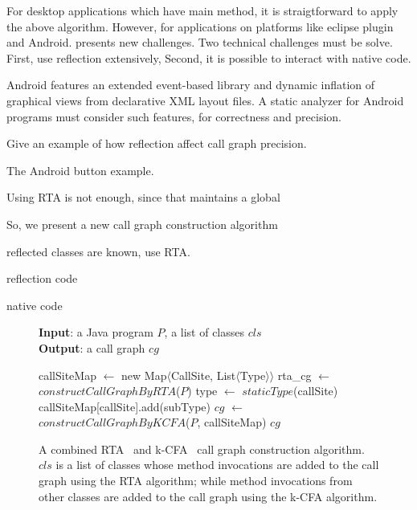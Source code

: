 For desktop applications which have main method, it is straigtforward to apply
the above algorithm. However, for applications on platforms like eclipse plugin
and Android. presents new challenges. Two technical challenges must be solve.
First, use reflection extensively, Second, it is possible to interact with
native code.

Android features an extended event-based library and dynamic inflation of
graphical views from declarative XML layout files.
A static analyzer for Android programs must consider such features, for
correctness and precision.

Give an example of how reflection affect call graph precision.

The Android button example.

Using RTA is not enough, since that maintains a global

So, we present a new call graph construction algorithm

reflected classes are known, use RTA.

reflection code

native code

\begin{figure}[t]
\textbf{Input}: a Java program $P$, a list of classes $cls$\\
\textbf{Output}: a call graph $cg$\\
\vspace{-5mm}
\begin{algorithmic}[1]
\STATE callSiteMap $\leftarrow$ new Map$\langle$CallSite, List$\langle$Type$\rangle$$\rangle$
\STATE rta\_cg $\leftarrow$ $constructCallGraphByRTA$($P$)
\STATE type $\leftarrow$ $staticType$(callSite)
\STATE callSiteMap[callSite].add(subType)
\ENDIF
\ENDFOR
\ENDIF
\ENDFOR
\ENDFOR
\STATE $cg$ $\leftarrow$ $constructCallGraphByKCFA$($P$, callSiteMap)
\RETURN $cg$
\vspace{-2mm}
\end{algorithmic}
\caption{A combined  RTA~\cite{rta} and k-CFA~\cite{kcfa} call graph construction algorithm.
$cls$ is a list of classes whose method invocations are added to the
call graph using the RTA algorithm; while method invocations from other classes
are added to the call graph using the k-CFA algorithm.
} \label{fig:cgalgorithm}
\end{figure}




